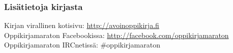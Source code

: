 \subsubsection*{Lisätietoja kirjasta}

Kirjan virallinen kotisivu: \url{http://avoinoppikirja.fi} \\
Oppikirjamaraton Facebookissa: \url{http://facebook.com/oppikirjamaraton} \\
Oppikirjamaraton IRCnetissä: \#oppikirjamaraton
